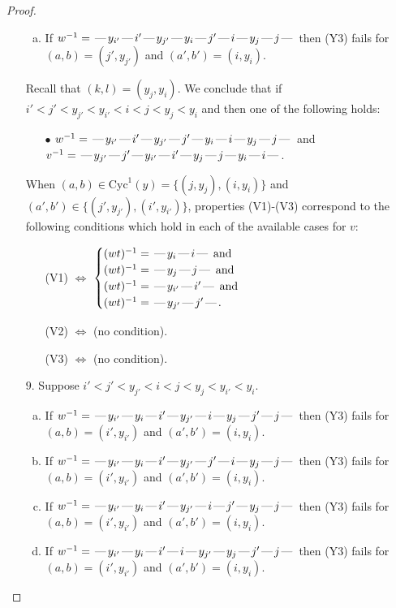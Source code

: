 \documentclass[10pt]{article}
\theoremstyle{definition}
\theoremstyle{definition}
\def\dash{\text{\hspace{0.5mm}---\hspace{0.5mm}}}
\def\Cyc{\mathrm{Cyc}}
\begin{document}
\begin{proof}
\begin{enumerate}
\begin{enumerate}[(a)]
\item If $w^{-1} = \dash y_{i'}\dash i'\dash y_{j'}\dash y_i\dash j'\dash i\dash y_j\dash j\dash $ then (Y3) fails for $(a,b)=(j',y_{j'})$ and $(a',b')=(i,y_i)$.
\end{enumerate}
Recall that $(k,l) = (y_j,y_i)$.
We conclude that if $i' < j' < y_{j'} < y_{i'} < i < j < y_j < y_i$ and then one of the following holds:
\begin{enumerate}
\item[$\bullet$] $w^{-1} = \dash y_{i'}\dash i'\dash y_{j'}\dash j'\dash y_i\dash i\dash y_j\dash j\dash $ and $v^{-1} = \dash y_{j'}\dash j'\dash y_{i'}\dash i'\dash y_j\dash j\dash y_i\dash i\dash $.
\end{enumerate}
When $(a,b)\in\Cyc^1(y)=\{(j,y_j),(i,y_i)\}$ and $(a',b')\in\{(j',y_{j'}),(i',y_{i'})\}$,
properties (V1)-(V3) correspond to the following conditions which hold in
each of the available cases for $v$:
\begin{enumerate}
\item[](V1) $\Leftrightarrow$ $\begin{cases}\text{$(wt)^{-1} = \dash y_i \dash i \dash$}\text{ and }\\
\text{$(wt)^{-1} = \dash y_j \dash j \dash$}\text{ and }\\
\text{$(wt)^{-1} = \dash y_{i'} \dash i' \dash$}\text{ and }\\
\text{$(wt)^{-1} = \dash y_{j'} \dash j' \dash$}.\end{cases}$
\item[](V2) $\Leftrightarrow$ (no condition).
\item[](V3) $\Leftrightarrow$ (no condition).
\end{enumerate}
\item[$9$.] Suppose $i' < j' < y_{j'} < i < j < y_j < y_{i'} < y_i$.
\begin{enumerate}[(a)]
\item If $w^{-1} = \dash y_{i'}\dash y_i\dash i'\dash y_{j'}\dash i\dash y_j\dash j'\dash j\dash $ then (Y3) fails for $(a,b)=(i',y_{i'})$ and $(a',b')=(i,y_i)$.
\item If $w^{-1} = \dash y_{i'}\dash y_i\dash i'\dash y_{j'}\dash j'\dash i\dash y_j\dash j\dash $ then (Y3) fails for $(a,b)=(i',y_{i'})$ and $(a',b')=(i,y_i)$.
\item If $w^{-1} = \dash y_{i'}\dash y_i\dash i'\dash y_{j'}\dash i\dash j'\dash y_j\dash j\dash $ then (Y3) fails for $(a,b)=(i',y_{i'})$ and $(a',b')=(i,y_i)$.
\item If $w^{-1} = \dash y_{i'}\dash y_i\dash i'\dash i\dash y_{j'}\dash y_j\dash j'\dash j\dash $ then (Y3) fails for $(a,b)=(i',y_{i'})$ and $(a',b')=(i,y_i)$.

\end{enumerate}
\end{enumerate}
\end{proof}
\end{document}
